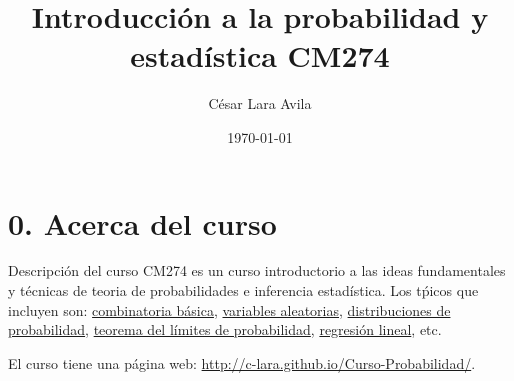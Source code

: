 \documentclass{beamer}
\title{Introducci\'on a la probabilidad y estad\'istica CM274}
\date{\today}
\author{C\'esar Lara Avila}
\institute{\url{https://github.com/C-Lara}}
\begin{document}
  \maketitle
  \section{0. Acerca del curso  }
  
  
 \begin{frame}{Descripci\'on del curso}
CM274 es un curso introductorio   a las ideas fundamentales y t\'ecnicas de teoria de probabilidades e inferencia estad\'istica. Los t\'picos que incluyen son: \underline{combinatoria b\'asica}, \underline{variables aleatorias}, \underline{distribuciones de probabilidad}, \underline{teorema del l\'imites de probabilidad}, \underline{regresi\'on lineal}, etc.

\vspace{0.2cm}

El curso tiene una p\'agina web: \textcolor{blue}{\url{http://c-lara.github.io/Curso-Probabilidad/}}.
 \end{frame}
\end{document}
